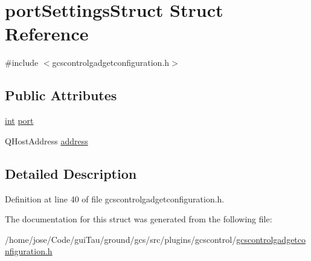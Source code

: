 \hypertarget{structport_settings_struct}{\section{port\-Settings\-Struct Struct Reference}
\label{structport_settings_struct}
}


{\ttfamily \#include $<$gcscontrolgadgetconfiguration.\-h$>$}

\subsection*{Public Attributes}
\begin{DoxyCompactItemize}
\item 
\hyperlink{ioapi_8h_a787fa3cf048117ba7123753c1e74fcd6}{int} \hyperlink{group___g_c_s_control_gadget_plugin_ga0f8fc6e0cdd5eac4d00a2b169f94c7a3}{port}
\item 
Q\-Host\-Address \hyperlink{group___g_c_s_control_gadget_plugin_ga4a1de1267a23f01dad6562a23ddf70f8}{address}
\end{DoxyCompactItemize}


\subsection{Detailed Description}


Definition at line 40 of file gcscontrolgadgetconfiguration.\-h.



The documentation for this struct was generated from the following file\-:\begin{DoxyCompactItemize}
\item 
/home/jose/\-Code/gui\-Tau/ground/gcs/src/plugins/gcscontrol/\hyperlink{gcscontrolgadgetconfiguration_8h}{gcscontrolgadgetconfiguration.\-h}\end{DoxyCompactItemize}
